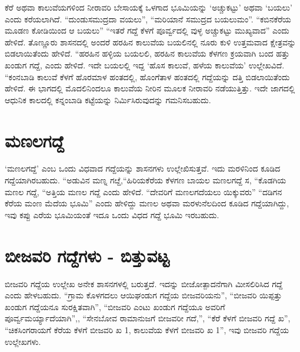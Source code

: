 ಕೆರೆ ಅಥವಾ ಕಾಲುವೆಯಗಳಿಂದ ನೀರಾವರಿ ಬೇಸಾಯಕ್ಕೆ ಒಳಗಾದ ಭೂಮಿಯನ್ನು ‘ಅಚ್ಚುಕಟ್ಟು’ ಅಥವಾ ‘ಬಯಲು’ ಎಂದು ಕರೆಯಲಾಗಿದೆ. “ದುಂಡುಸಮುದ್ರದಾ ವಯಲು”, “ಮರಿಯಾನೆ ಸಮುದ್ರದ ಬಯಲುಮಂ”. “ಕಬಿನಕೆರೆಯ ಮೂಡಣ ಕೋಡಿಯಿಂದ ಆ ಬಯಲು” “ಇತರೆ ಗದ್ದೆ ಕೆಳಗೆ ಪೂರ್ವ್ವದಲ್ಲಿ ವುಳ್ಳ ಅಚ್ಚುಕಟ್ಟು ಮುಖ್ಯವಾದ” ಎಂದು ಹೇಳಿದೆ. ತೊಣ್ಣೂರು ಶಾಸನದಲ್ಲಿ ಅಂದರೆ ಹರಹಿನ ಕಾಲುವೆಯ ಬಯಲಿನಲ್ಲಿ ನೂರು ಕುಳಿ ಉತ್ತಮವಾದ ಕ್ಷೇತ್ರವನ್ನು ಬಿಡಲಾಯಿತೆಂದು ಹೇಳಿದೆ. “ಹರಹಿನ ಹಳ್ಳಿಯ ಬಯಲಲಿ, ಹರಹಿನ ಕಾಲುವೆಯ ಕೆಳಗಣ ಕ್ರಯವಾಗಿ ಬಂದ ಹತ್ತು ಖಂಡುಗ ಗದ್ದೆ, ಎಂದು ಹೇಳಿದೆ. ಇದೇ ಬಯಲಲ್ಲಿ ಇದ್ದ ‘ಹೊಸ ಕಾಲುವೆ, ಹಳೆಯ ಕಾಲುವೆಯ’ ಉಲ್ಲೇಖವಿದೆ. “ಕಂನಬಾಡಿ ಕಾಲುವೆ ಕೆಳಗೆ ಹೊರಮಾಳ ಹಂತದಲ್ಲಿ, ಹೊಂಗೆತಾಳ ಹಂತದಲ್ಲಿ ಗದ್ದೆಯನ್ನು ದತ್ತಿ ಬಿಡಲಾಯಿತೆಂದು ಹೇಳಿದೆ. ಈ ಭಾಗದಲ್ಲಿ ಮೊದಲಿನಿಂದಲೂ ಕಾಲುವೆಯ ನೀರಿನ ಮೂಲಕ ನೀರಾವರಿ ನಡೆಯುತ್ತಿತ್ತು. ಇದೇ ಜಾಗದಲ್ಲಿ ಆಧುನಿಕ ಕಾಲದಲ್ಲಿ ಕನ್ನಂಬಾಡಿ ಕಟ್ಟೆಯನ್ನು ನಿರ್ಮಿಸಿರುವುದನ್ನು ಗಮನಿಸಬಹುದು.


\section{ಮಣಲಗದ್ದೆ}

‘ಮಣಲಗದ್ದೆ’ ಎಂಬ ಒಂದು ವಿಧವಾದ ಗದ್ದೆಯನ್ನು ಶಾಸನಗಳು ಉಲ್ಲೇಖಿಸುತ್ತವೆ. ಇದು ಮರಳಿನಿಂದ ಕೂಡಿದ ಗದ್ದೆಯಾಗಿರಬಹುದು. “ಅಡುವಿನ ಮಣ್ನ ಗೞ್ದೆ,“ಹಿರಿಯಕೆರೆಯ ಕೆಳಗಣ ಬಾಯಲ ಮಣಲಗದ್ದೆ ಸ, “ಕೊಡಗಿಯ ಮಣಲ ಗದ್ದೆ, “ಅತ್ತಿಯ ಮಣಲ ಗದ್ದೆ ಎಂದು ಹೇಳಿದೆ. “ದೇವರಿಗೆ ಮಣಲಗದೆಯಲು ಯಿಕ್ಕುವರು” “ದಡಿಗನ ಕೆರೆಯ ಮಂಣ ಮೆದೆಯ ಭೂಮಿ” ಎಂದು ಹೇಳಿದ್ದು ಮಣಲ ಅಥವಾ ಮರಳುನೆಲದಿಂದ ಕೂಡಿದ ಗದ್ದೆಯಾಗಿದ್ದು, ಇವು ಕಪ್ಪು ಎರೆಯ ಭೂಮಿಯಂತೆ ಇದೂ ಒಂದು ವಿಧದ ಗದ್ದೆ ಭೂಮಿ ಇರಬಹುದು.


\section{ಬೀಜವರಿ ಗದ್ದೆಗಳು - ಬಿತ್ತುವಟ್ಟ}

ಬೀಜವರಿ ಗದ್ದೆಯ ಉಲ್ಲೇಖ ಅನೇಕ ಶಾಸನಗಳಲ್ಲಿ ಬರುತ್ತದೆ. ಇದನ್ನು ಬೀಜೋತ್ಪಾದನೆಗಾಗಿ ಮೀಸಲಿರಿಸಿದ ಗದ್ದೆ ಎಂದು ಹೇಳಬಹುದು. “ಗ್ರಾಮ ಕೊಳಗದಲು ಆಯಿಘಂಡುಗ ಗದ್ದೆಯ ಬೀಜವರಿಯನು”, “ಬೀಜವರಿ ಯಿಪ್ಪತ್ತು ಖಂಡುಗ ಗದ್ದೆಯನೂ ಸುರಕ್ಷಿತವಾಗಿ”, “ಬೀಜವರಿ ಎಂಟು ಖಂಡುಗ ಗದ್ದೆಯೂ ಅವರಿಗೆ ಪೂರ್ವ್ವಮರ್ಯ್ಯಾದೆಯಾಗಿ”,, “ಸೇನಬೋವ ರಾಮಾನುಜಗೆ ಬೀಜವರೀ ಗದೆ,”, “ಕೆರೆ ಕೆಳಗೆ ಬೀಜವರಿ ಗದ್ದೆ ಖ”, “ಚಿಕಸಿಂಗರಾಯಗೆ ಕೆರೆಯ ಕೆಳಗೆ ಬೀಜವರಿ ಖ 1, ಕಾಲುವೆಯ ಕೆಳಗೆ ಬೀಜವರಿ ಖ 1”, ಇವು ಬೀಜವರಿ ಗದ್ದೆಯ ಉಲ್ಲೇಖಗಳು.

